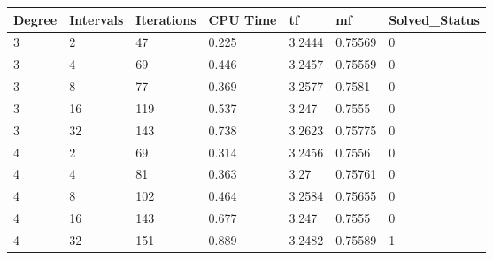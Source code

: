 \begin{tabular}{lllllll}
Degree & Intervals & Iterations & CPU Time & tf & mf & Solved_Status \\ 
\hline 
3 & 2 & 47 & 0.225 & 3.2444 & 0.75569 & 0 \\ 
3 & 4 & 69 & 0.446 & 3.2457 & 0.75559 & 0 \\ 
3 & 8 & 77 & 0.369 & 3.2577 & 0.7581 & 0 \\ 
3 & 16 & 119 & 0.537 & 3.247 & 0.7555 & 0 \\ 
3 & 32 & 143 & 0.738 & 3.2623 & 0.75775 & 0 \\ 
4 & 2 & 69 & 0.314 & 3.2456 & 0.7556 & 0 \\ 
4 & 4 & 81 & 0.363 & 3.27 & 0.75761 & 0 \\ 
4 & 8 & 102 & 0.464 & 3.2584 & 0.75655 & 0 \\ 
4 & 16 & 143 & 0.677 & 3.247 & 0.7555 & 0 \\ 
4 & 32 & 151 & 0.889 & 3.2482 & 0.75589 & 1 \\ 
\hline 
\end{tabular}